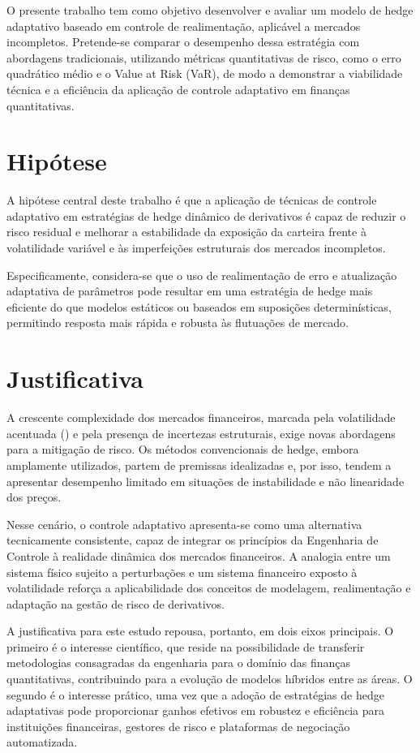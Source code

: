 O presente trabalho tem como objetivo desenvolver e avaliar um modelo de hedge adaptativo baseado em controle de realimentação, aplicável a mercados incompletos. Pretende-se comparar o desempenho dessa estratégia com abordagens tradicionais, utilizando métricas quantitativas de risco, como o erro quadrático médio e o Value at Risk (VaR), de modo a demonstrar a viabilidade técnica e a eficiência da aplicação de controle adaptativo em finanças quantitativas.


\section{Hipótese}\label{sec:hipotese}
A hipótese central deste trabalho é que a aplicação de técnicas de controle adaptativo em estratégias de hedge dinâmico de derivativos é capaz de reduzir o risco residual e melhorar a estabilidade da exposição da carteira frente à volatilidade variável e às imperfeições estruturais dos mercados incompletos.

Especificamente, considera-se que o uso de realimentação de erro e atualização adaptativa de parâmetros pode resultar em uma estratégia de hedge mais eficiente do que modelos estáticos ou baseados em suposições determinísticas, permitindo resposta mais rápida e robusta às flutuações de mercado.



\section{Justificativa}\label{sec:justificativa}
A crescente complexidade dos mercados financeiros, marcada pela volatilidade acentuada (\textcite{gaillardetzRiskControlStrategies2019}) e pela presença de incertezas estruturais, exige novas abordagens para a mitigação de risco. Os métodos convencionais de hedge, embora amplamente utilizados, partem de premissas idealizadas e, por isso, tendem a apresentar desempenho limitado em situações de instabilidade e não linearidade dos preços.

Nesse cenário, o controle adaptativo apresenta-se como uma alternativa tecnicamente consistente, capaz de integrar os princípios da Engenharia de Controle à realidade dinâmica dos mercados financeiros. A analogia entre um sistema físico sujeito a perturbações e um sistema financeiro exposto à volatilidade reforça a aplicabilidade dos conceitos de modelagem, realimentação e adaptação na gestão de risco de derivativos.

A justificativa para este estudo repousa, portanto, em dois eixos principais. O primeiro é o interesse científico, que reside na possibilidade de transferir metodologias consagradas da engenharia para o domínio das finanças quantitativas, contribuindo para a evolução de modelos híbridos entre as áreas. O segundo é o interesse prático, uma vez que a adoção de estratégias de hedge adaptativas pode proporcionar ganhos efetivos em robustez e eficiência para instituições financeiras, gestores de risco e plataformas de negociação automatizada.

